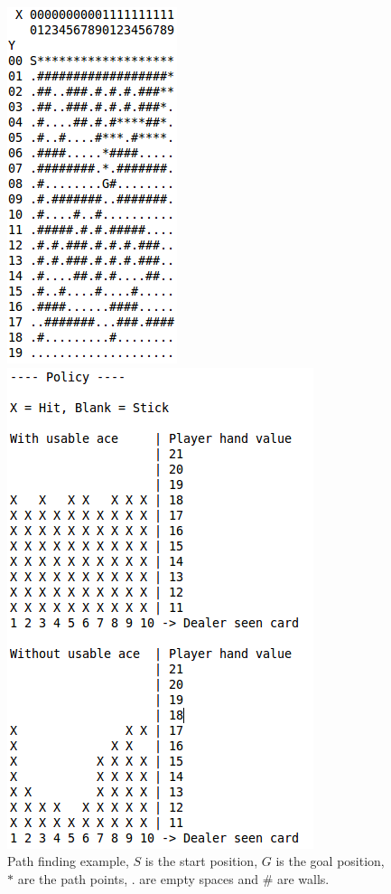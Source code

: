 \documentclass[12pt]{article}
\begin{document}
\begin{figure}[htbp!]
\centering
\begin{minipage}[t]{0.3\linewidth}
	\includegraphics[scale=0.6]{images/a_star_res1}
	\caption{Path finding example, $S$ is the start position, $G$ is the goal position, $*$ are the path points, $.$ are empty spaces and \# are walls.}
	\label{fig:A_start}
\end{minipage}
\quad
\begin{minipage}[t]{0.3\linewidth}
	\includegraphics[scale=0.35]{images/blackjack_0_2_Q}

\end{minipage}
\end{figure}
\end{document}
